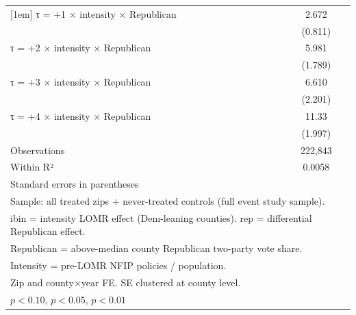 \begin{table}[htbp]
\begin{tabular}{l*{1}{c}}
[1em]
τ = +1 × intensity × Republican&       2.672\sym{***}\\
                    &     (0.811)         \\
[1em]
τ = +2 × intensity × Republican&       5.981\sym{***}\\
                    &     (1.789)         \\
[1em]
τ = +3 × intensity × Republican&       6.610\sym{***}\\
                    &     (2.201)         \\
[1em]
τ = +4 × intensity × Republican&       11.33\sym{***}\\
                    &     (1.997)         \\
\hline
Observations        &     222,843         \\
Within R²           &      0.0058         \\
\hline\hline
\multicolumn{2}{l}{\footnotesize Standard errors in parentheses}\\
\multicolumn{2}{l}{\footnotesize Sample: all treated zips + never-treated controls (full event study sample).}\\
\multicolumn{2}{l}{\footnotesize ibin = intensity LOMR effect (Dem-leaning counties). rep = differential Republican effect.}\\
\multicolumn{2}{l}{\footnotesize Republican = above-median county Republican two-party vote share.}\\
\multicolumn{2}{l}{\footnotesize Intensity = pre-LOMR NFIP policies / population.}\\
\multicolumn{2}{l}{\footnotesize Zip and county×year FE. SE clustered at county level.}\\
\multicolumn{2}{l}{\footnotesize \sym{*} \(p<0.10\), \sym{**} \(p<0.05\), \sym{***} \(p<0.01\)}\\
\end{tabular}
\end{table}
